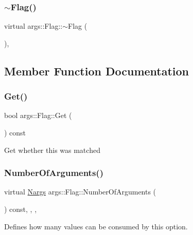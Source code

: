 \subsubsection{\texorpdfstring{$\sim$\+Flag()}{~Flag()}}
{\footnotesize\ttfamily virtual args\+::\+Flag\+::$\sim$\+Flag (\begin{DoxyParamCaption}{ }\end{DoxyParamCaption})\hspace{0.3cm}{\ttfamily [inline]}, {\ttfamily [virtual]}}



\subsection{Member Function Documentation}
\mbox{\label{classargs_1_1_flag_a5cdbec9617c6776ab2e3b67c0a72fd9a}} 
\subsubsection{\texorpdfstring{Get()}{Get()}}
{\footnotesize\ttfamily bool args\+::\+Flag\+::\+Get (\begin{DoxyParamCaption}{ }\end{DoxyParamCaption}) const\hspace{0.3cm}{\ttfamily [inline]}}

Get whether this was matched \mbox{\label{classargs_1_1_flag_a1bd707628d2987d3ccf2dbdb810302e4}} 
\subsubsection{\texorpdfstring{Number\+Of\+Arguments()}{NumberOfArguments()}}
{\footnotesize\ttfamily virtual \hyperlink{structargs_1_1_nargs}{Nargs} args\+::\+Flag\+::\+Number\+Of\+Arguments (\begin{DoxyParamCaption}{ }\end{DoxyParamCaption}) const\hspace{0.3cm}{\ttfamily [inline]}, {\ttfamily [override]}, {\ttfamily [virtual]}, {\ttfamily [noexcept]}}

Defines how many values can be consumed by this option.

